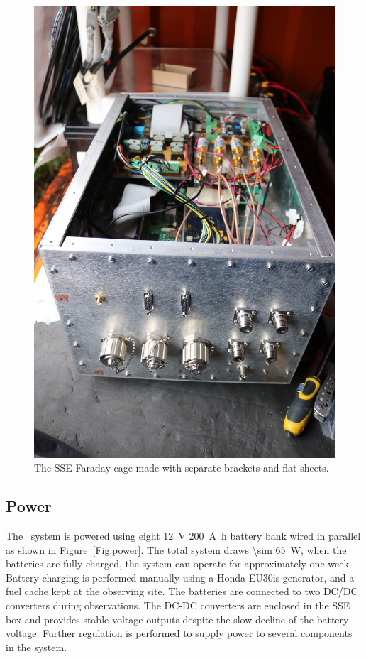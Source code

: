 \begin{figure}
	\centering
	\includegraphics[width=0.4\linewidth]{Figures/47093285614_63bb00be20_o}
	\caption{The SSE Faraday cage made with separate brackets and flat sheets.}
	\label{Fig:47093285614_63bb00be20_o}
\end{figure}       

\subsection{Power}

The \prizm\ system is powered using eight \SI{12}{\volt} \SI{200}{\ampere \hour} battery bank wired in parallel as shown in Figure~\ref{Fig:power}. The total system draws \SI{\sim 65}{\watt}, when the batteries are fully charged, the system can operate for approximately one week. Battery charging is performed manually using a Honda EU30is generator, and a fuel cache kept at the observing site. The batteries are connected to two DC/DC converters during observations. The DC-DC converters are enclosed in the SSE box and provides stable voltage outputs despite the slow decline of the battery voltage. Further regulation is performed to supply power to several components in the system.


